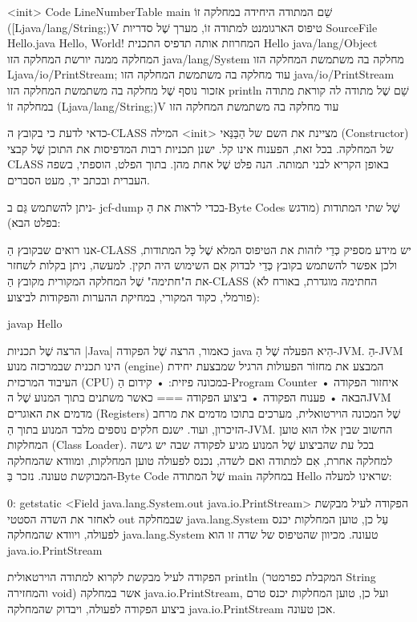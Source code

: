 <init>
Code
LineNumberTable
main שֵׁם המתודה היחידה במחלקה זוֹ
([Ljava/lang/String;)V טיפוס הארגומנט למתודה זוֹ, מערך שֶׁל
סדריות
SourceFile
Hello.java
Hello, World! המחרוזת אותה תדפיס התכנית
Hello
java/lang/Object המחלקה ממנה יורשת
המחלקה הזו
java/lang/System מחלקה בה משתמשת המחלקה
הזו
Ljava/io/PrintStream; עוד מחלקה בה משתמשת המחלקה
הזו
java/io/PrintStream אזכור נוסף שֶׁל מחלקה בה משתמשת
המחלקה הזו
println שֵׁם שֶׁל מתודה לה קוראת מתודה במחלקה זוֹ
(Ljava/lang/String;)V עוד מחלקה בה משתמשת המחלקה
הזו

כדאי לדעת כי בקובץ ה-CLASS המילה <init> מציינת את השם של הַבַּנַּאי
(Constructor) של המחלקה.
בכל זאת, הפענוח אינו קל. ישנן תכניות רבות המדפיסות את התוכן שֶׁל קבצי
CLASS באופן הקריא לבני תמותה. הנה פלט שֶׁל אחת מהן. בתוך הפלט, הוספתי, בשפה
העברית ובכתב יד, מעט הסברים.

ניתן להשתמש גַּם ב- jcf-dump בכדי לראות את הַ-Byte Codes שֶׁל שתי המתודות
(מודגש בפלט הבא):


אנו רואים שבקובץ הַ-CLASS יש מידע מספיק כְּדֵי לזהות את הטיפוס המלא שֶׁל כָּל
המתודות, ולכן אפשר להשתמש בקובץ כְּדֵי לבדוק אִם השימוש היה תקין. למעשה, ניתן
בקלות לשחזר את ה"חתימה" שֶׁל המחלקה המקורית מקובץ הַ-CLASS (החתימה
מוגדרת, באורח לֹא פורמלי, כקוד המקורי, במחיקת ההערות והפקודות לביצוע):

javap Hello
\END

הרצה שֶׁל תכניות \E|Java|
כאמור, הרצה שֶׁל הפקודה java הִיא הפעלה שֶׁל הַ-JVM. הַ-JVM הינו
תכנית שבמרכזה מנוע (engine) המבצע את מחזוֹר הפעולות הרגיל שמבצעת יחידת
העיבוד המרכזית (CPU) במכונה פיזית:
• קידום הַ-Program Counter
• איחזור הפקודה הבאה
• פענוח הפקודה
• ביצוע הפקודה
===
כאשר משתנים בתוך המנוע שֶׁל הJVM מדמים את האוגרים (Registers) שֶׁל המכונה
הוירטואלית, מערכים בתוכו מדמים את מרחב הזיכרון, ועוד.
ישנם חלקים נוספים מלבד המנוע בתוך הַ-JVM. החשוב שבין אלו הוּא טוען המחלקות
(Class Loader). בכל עת שהביצוע שֶׁל המנוע מגיע לפקודה שבה יש גישה למחלקה
אחרת, אִם למתודה ואם לשדה, נכנס לפעולה טוען המחלקות, ומוודא שהמחלקה
המבוקשת טעונה.
נזכר בַּ-Byte Code שֶׁל המתודה main במחלקה Hello שראינו למעלה:

  0: getstatic <Field java.lang.System.out java.io.PrintStream>
הפקודה לעיל מבקשת לאחזר את השדה הסטטי out שבמחלקה java.lang.System עַל כן,
טוען המחלקות יכנס לפעולה, ויוודא שהמחלקה java.lang.System טעונה. מכיוון
שהטיפוס של שדה זו הוא java.io.PrintStream

הפקודה לעיל מבקשת לקרוא למתודה הוירטאולית println (המקבלת כפרמטר String
והמחזירה void) אשר במחלקה java.io.PrintStream, ועל כן, טוען המחלקות
יכנס טרם ביצוע הפקודה לפעולה, ויבדוק שהמחלקה java.io.PrintStream אכן טעונה.

